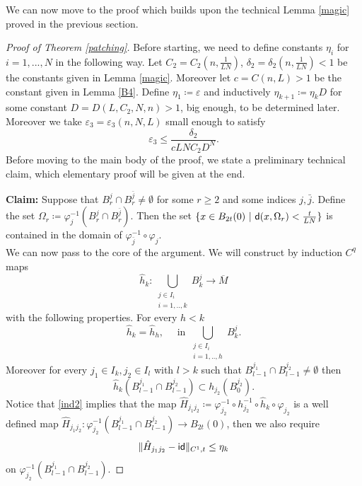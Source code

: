 \documentclass[11pt]{article}
\newcommand{\eps}{\varepsilon}
\newcommand{\sfd}{{\sf d}}
\renewcommand{\phi}{\varphi}
\theoremstyle{plain}
\theoremstyle{definition}
\numberwithin{equation}{section}
\begin{document}
We can now move to the proof  which builds upon the technical Lemma \ref{magic} proved in the previous section.
\begin{proof}[Proof of Theorem \ref{patching}]
	Before starting, we need to define constants $\eta_i$ for $i=1,...,N$ in the following way. Let $C_2=C_2(n,\frac{1}{LN})$, $\delta_2=\delta_2(n,\frac{1}{LN})<1$ be the constants given in Lemma \ref{magic}. Moreover let $c=C(n,L)>1$ be the constant given in Lemma \ref{B4}. Define $\eta_1\coloneqq \eps$ and inductively $\eta_{k+1}\coloneqq \eta_k D$ for some constant $D=D(L,C_2,N,n)>1$, big enough, to be determined later. Moreover we take $\eps_3=\eps_3(n,N,L)$ small enough to satisfy 
	\begin{equation}\label{etak}
		\eps_3 \le \frac{\delta_2}{cLNC_2D^N}.
	\end{equation}
	Before moving to the main body of the proof, we state a preliminary technical claim, which elementary proof will be given at the end.
	
	\noindent\textbf{Claim:} Suppose that $B^j_r\cap B^{\bar j}_r\neq \emptyset$ for some $r \ge 2$ and some indices $j, \bar j$. Define the set $\Omega_{r}\coloneqq \phi_j^{-1}(B^j_r\cap B^{\bar j}_r)$. Then the set $\{x \in B_{2t}(0) \ | \ \sfd(x,\Omega_r)<\frac{t}{LN}\}$ is contained in the domain of $\phi_{\bar j}^{-1}\circ \phi_{ j}$.\\
	
	
	We can now pass to the core of the argument. We will construct by induction $C^q$ maps $$\hat h_k : \bigcup_{\substack{{j \in I_i}\\{i=1,..,k}}} B^j_{k}\to {\overline M}$$ with the following properties. For every $h < k$
	\begin{equation}\label{ind1}
		\hat h_k=\hat h_h, \quad \text{ in } \bigcup_{\substack{{j \in I_i}\\{i=1,..,h}}} B^j_{k}.
	\end{equation}
	 Moreover for every $j_1 \in I_k, j_2 \in I_l$ with $l>k$ such that $B_{l-1}^{j_1} \cap B_{l-1}^{j_2}\neq \emptyset$ then
	\begin{equation}\label{ind2}
		\hat h_k\left(B_{l-1}^{j_1} \cap B_{l-1}^{j_2} \right)\subset h_{j_2}(B_0^{j_2}).
	\end{equation}
	Notice that \eqref{ind2} implies that the map $\hat H_{j_1j_2}\coloneqq \phi_{j_2}^{-1}\circ h_{j_2}^{-1}\circ \hat h_{k} \circ \phi_{j_2}$ is a well defined map $ \hat H_{j_1j_2}:\phi_{j_2}^{-1}\left(B_{l-1}^{j_1} \cap B_{l-1}^{j_2} \right) \to B_{2t}(0) $, then we also require
	\begin{equation}\label{ind3}
		\| \hat H_{j_1j_2}-{\sf{id}}\|_{C^1,t}\le \eta_k
	\end{equation}
	on $\phi_{j_2}^{-1}\left(B_{l-1}^{j_1} \cap B_{l-1}^{j_2} \right)$.
	

\end{proof}
\end{document}
